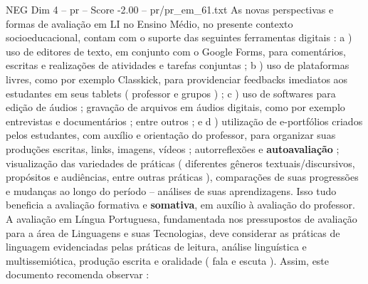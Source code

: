 \begin{textsample}{NEG Dim 4 – pr – Score -2.00 – pr/pr\_em\_61.txt}
As novas perspectivas e formas de avaliação em LI no Ensino Médio, no presente contexto socioeducacional, contam com o suporte das seguintes ferramentas digitais : a ) uso de editores de texto, em conjunto com o Google Forms, para comentários, escritas e realizações de atividades e tarefas conjuntas ; b ) uso de plataformas livres, como por exemplo Classkick, para providenciar feedbacks imediatos aos estudantes em seus tablets ( professor e grupos ) ; c ) uso de softwares para edição de áudios ; gravação de arquivos em áudios digitais, como por exemplo entrevistas e documentários ; entre outros ; e d ) utilização de e-portfólios criados pelos estudantes, com auxílio e orientação do professor, para organizar suas produções escritas, links, imagens, vídeos ; autorreflexões e \textbf{autoavaliação} ; visualização das variedades de práticas ( diferentes gêneros textuais/discursivos, propósitos e audiências, entre outras práticas ), comparações de suas progressões e mudanças ao longo do período – análises de suas aprendizagens.
Isso tudo beneficia a avaliação formativa e \textbf{somativa}, em auxílio à avaliação do professor.
A avaliação em Língua Portuguesa, fundamentada nos pressupostos de avaliação para a área de Linguagens e suas Tecnologias, deve considerar as práticas de linguagem evidenciadas pelas práticas de leitura, análise linguística e multissemiótica, produção escrita e oralidade ( fala e escuta ).
Assim, este documento recomenda observar :

\end{textsample}
